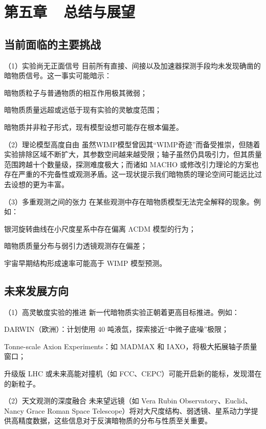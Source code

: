 \section*{第五章~~总结与展望}

\setcounter{section}{5} \setcounter{subsection}{0}
\setcounter{table}{0} \setcounter{figure}{0} \setcounter{equation}{0}

\subsection{当前面临的主要挑战}

（1）实验尚无正面信号
目前所有直接、间接以及加速器探测手段均未发现确凿的暗物质信号。这一事实可能暗示：

暗物质粒子与普通物质的相互作用极其微弱；

暗物质质量远超或远低于现有实验的灵敏度范围；

暗物质并非粒子形式，现有模型设想可能存在根本偏差。

（2）理论模型高度自由
虽然WIMP模型曾因其“WIMP奇迹”而备受推崇，但随着实验排除区域不断扩大，其参数空间越来越受限；轴子虽然仍具吸引力，但其质量范围跨越十个数量级，探测难度极大；而诸如 MACHO 或修改引力理论的方案也存在严重的不完备性或观测矛盾。这一现状提示我们暗物质的理论空间可能远比过去设想的更为丰富。

（3）多重观测之间的张力
在某些观测中存在暗物质模型无法完全解释的现象。例如：

银河旋转曲线在小尺度星系中存在偏离 ΛCDM 模型的行为；

暗物质质量分布与弱引力透镜观测存在偏差；

宇宙早期结构形成速率可能高于 WIMP 模型预测。

\subsection{未来发展方向}

（1）高灵敏度实验的推进
新一代暗物质实验正朝着更高目标推进。例如：

DARWIN（欧洲）：计划使用 40 吨液氙，探索接近“中微子底噪”极限；

Tonne-scale Axion Experiments：如 MADMAX 和 IAXO，将极大拓展轴子质量窗口；

升级版 LHC 或未来高能对撞机（如 FCC、CEPC）可能开启新的能标，发现潜在的新粒子。

（2）天文观测的深度融合
未来望远镜（如 Vera Rubin Observatory、Euclid、Nancy Grace Roman Space Telescope）将对大尺度结构、弱透镜、星系动力学提供高精度数据，这些信息对于反演暗物质的分布与性质至关重要。

